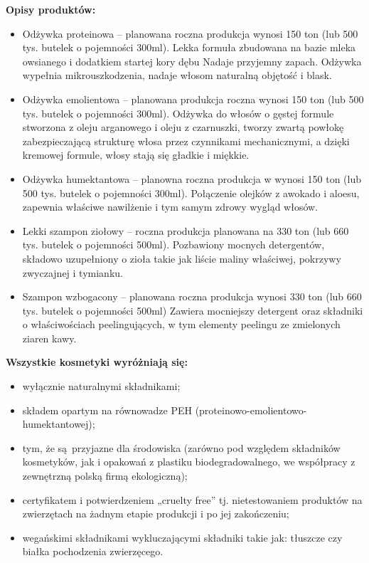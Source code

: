 \textbf{Opisy produktów:}
\begin{itemize}
	\item Odżywka proteinowa -- planowana roczna produkcja wynosi 150 ton (lub 500 tys. butelek o pojemności 300ml). Lekka formuła zbudowana na bazie mleka owsianego i dodatkiem startej kory dębu Nadaje przyjemny zapach. Odżywka wypełnia mikrouszkodzenia, nadaje włosom naturalną objętość i blask.
	\item Odżywka emolientowa -- planowana produkcja roczna wynosi 150 ton (lub 500 tys. butelek o pojemności 300ml). Odżywka do włosów o gęstej formule stworzona z oleju arganowego i oleju z czarnuszki, tworzy zwartą powłokę zabezpieczającą strukturę włosa przez czynnikami mechanicznymi, a dzięki kremowej formule, włosy stają się gładkie i miękkie.
	\item Odżywka humektantowa -- planowna roczna produkcja w wynosi 150 ton (lub 500 tys. butelek o pojemności 300ml). Połączenie olejków z awokado i aloesu, zapewnia właściwe nawilżenie i tym samym zdrowy wygląd włosów.
	\item Lekki szampon ziołowy -- roczna produkcja planowana na 330 ton (lub 660 tys. butelek o pojemności 500ml). Pozbawiony mocnych detergentów, składowo uzupełniony o zioła takie jak liście maliny właściwej, pokrzywy zwyczajnej i tymianku.
	\item Szampon wzbogacony -- planowana roczna produkcja wynosi 330 ton (lub 660 tys. butelek o pojemności 500ml) Zawiera mocniejszy detergent oraz składniki o właściwościach peelingujących, w tym elementy peelingu ze zmielonych ziaren kawy.
\end{itemize}\vspace{\baselineskip}

\textbf{Wszystkie kosmetyki wyróżniają się:}
\begin{itemize}
\item wyłącznie naturalnymi składnikami;
\item składem opartym na równowadze PEH (proteinowo-emolientowo-humektantowej);
\item tym, że są przyjazne dla środowiska (zarówno pod względem składników kosmetyków, jak i opakowań z plastiku biodegradowalnego, we współpracy z zewnętrzną polską firmą ekologiczną);
\item certyfikatem i potwierdzeniem „cruelty free” tj. nietestowaniem produktów na zwierzętach na żadnym etapie produkcji i po jej zakończeniu;
\item wegańskimi składnikami wykluczającymi składniki takie jak: tłuszcze czy białka pochodzenia zwierzęcego.
\end{itemize}\vspace{\baselineskip}

